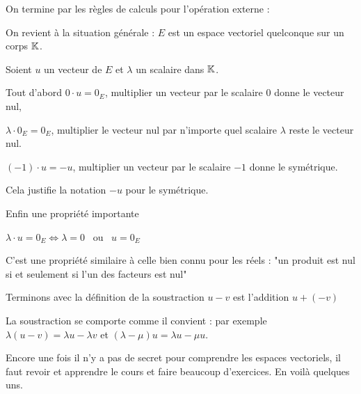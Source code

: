 On termine par les règles de calculs pour l'opération externe :

On revient à la situation générale : $E$ est un espace vectoriel quelconque sur un corps $\mathbb{K}$.

Soient $u$ un vecteur de $E$ et $\lambda$ un scalaire dans $\mathbb{K}$. 


\change

Tout d'abord $0 \cdot u = 0_E$, multiplier un vecteur par le scalaire $0$ donne le vecteur nul,

\change

$\lambda \cdot 0_E = 0_E$, 
multiplier le vecteur nul par n'importe quel scalaire $\lambda$ reste le vecteur nul.

\change

$(-1)\cdot u = -u$, multiplier un vecteur par le scalaire $-1$ donne le symétrique.

Cela justifie la notation $-u$ pour le symétrique.

\change

Enfin une propriété importante 

$\lambda \cdot u = 0_E \iff \lambda = 0$ \ ou \ $u = 0_E$

C'est une propriété similaire à celle bien connu pour les réels : 
"un produit est nul si et seulement si l'un des facteurs est nul"


\change

Terminons avec la définition de la soustraction
$u-v$ est l'addition $u+(-v)$

\change

La soustraction se comporte comme il convient :
par exemple  $\lambda (u-v)=\lambda u -\lambda v$
 et $(\lambda -\mu)u=\lambda u-\mu u$.

\diapo

Encore une fois il n'y a pas de secret pour comprendre les espaces vectoriels, il faut
revoir et apprendre le cours et faire beaucoup d'exercices. En voilà quelques uns.




